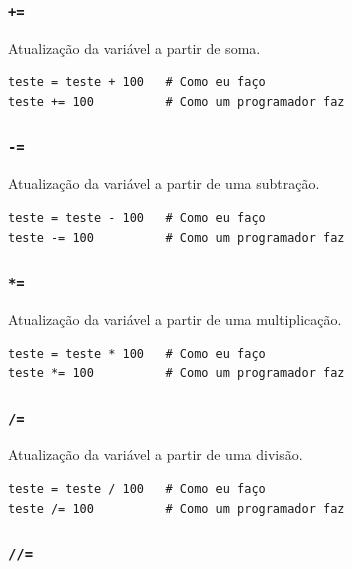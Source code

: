 \documentclass[]{book}
\begin{document}
\subsubsection{\texorpdfstring{\texttt{+=}}{+=}}\label{section}

Atualização da variável a partir de soma.

\begin{verbatim}
teste = teste + 100   # Como eu faço
teste += 100          # Como um programador faz
\end{verbatim}

\subsubsection{\texorpdfstring{\texttt{-=}}{-=}}\label{section-1}

Atualização da variável a partir de uma subtração.

\begin{verbatim}
teste = teste - 100   # Como eu faço
teste -= 100          # Como um programador faz
\end{verbatim}

\subsubsection{\texorpdfstring{\texttt{*=}}{*=}}\label{section-2}

Atualização da variável a partir de uma multiplicação.

\begin{verbatim}
teste = teste * 100   # Como eu faço
teste *= 100          # Como um programador faz
\end{verbatim}

\subsubsection{\texorpdfstring{\texttt{/=}}{/=}}\label{section-3}

Atualização da variável a partir de uma divisão.

\begin{verbatim}
teste = teste / 100   # Como eu faço
teste /= 100          # Como um programador faz
\end{verbatim}

\subsubsection{\texorpdfstring{\texttt{//=}}{//=}}\label{section-4}
\end{document}
